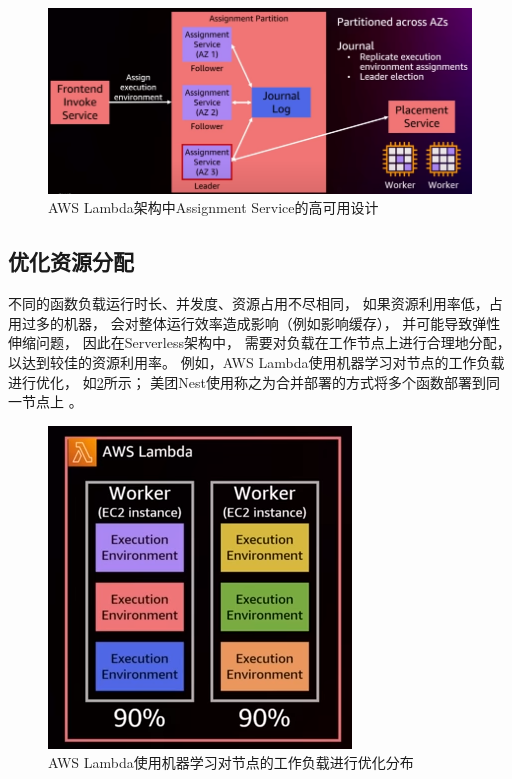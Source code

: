 \begin{figure}[ht!]
    \centering
    \includegraphics[width=\linewidth]{images/lambda_assignment_service.png}
    \caption{AWS Lambda架构中Assignment Service的高可用设计\cite{aws_lambda_2022}}
    \label{lambda_assignment_service}
\end{figure}

\subsection{优化资源分配}
不同的函数负载运行时长、并发度、资源占用不尽相同，
如果资源利用率低，占用过多的机器，
会对整体运行效率造成影响（例如影响缓存），
并可能导致弹性伸缩问题，
因此在Serverless架构中，
需要对负载在工作节点上进行合理地分配，
以达到较佳的资源利用率。
例如，AWS Lambda使用机器学习对节点的工作负载进行优化，
如\cref{lambda_distribution}所示；
美团Nest使用称之为合并部署的方式将多个函数部署到同一节点上
\cite{meituan_serverless_nest}。

\begin{figure}[ht!]
    \centering
    \includegraphics[width=0.5\linewidth]{images/lambda_distribution.png}
    \caption{AWS Lambda使用机器学习对节点的工作负载进行优化分布\cite{aws_lambda_2022}}
    \label{lambda_distribution}
\end{figure}


